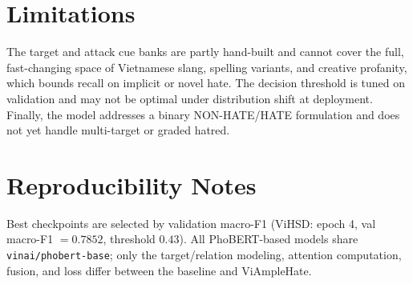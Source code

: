 \documentclass[11pt]{article}
\begin{document}
\section*{Limitations}
The target and attack cue banks are partly hand-built and cannot cover the full, fast-changing space of Vietnamese slang, spelling variants, and creative profanity, which bounds recall on implicit or novel hate. The decision threshold is tuned on validation and may not be optimal under distribution shift at deployment. Finally, the model addresses a binary NON-HATE/HATE formulation and does not yet handle multi-target or graded hatred.




\appendix
\section{Reproducibility Notes}
\label{sec:appendix}
Best checkpoints are selected by validation macro-F1 (ViHSD: epoch 4, val macro-F1 $=0.7852$, threshold $0.43$). All PhoBERT-based models share \texttt{vinai/phobert-base}; only the target/relation modeling, attention computation, fusion, and loss differ between the baseline and ViAmpleHate.
\end{document}
